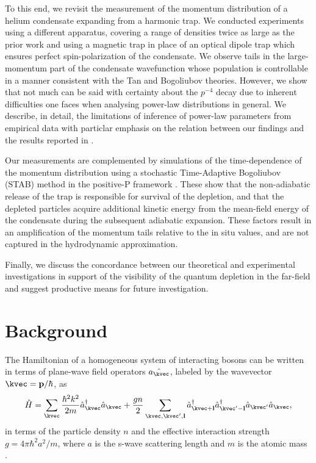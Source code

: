 	To this end, we revisit the measurement of the momentum distribution of a helium condensate expanding from a harmonic trap. 
	We conducted experiments using a different apparatus, covering a range of densities twice as large as the prior work and using a magnetic trap in place of an optical dipole trap which ensures perfect spin-polarization of the condensate. 
	We observe tails in the large-momentum part of the condensate wavefunction whose population is controllable in a manner consistent with the Tan and Bogoliubov theories.
	However, we show that not much can be said with certainty about the $p^{-4}$ decay due to inherent difficulties one faces when analysing power-law distributions in general. 
	We describe, in detail, the limitations of inference of power-law parameters from empirical data with particlar emphasis on the relation between our findings and the results reported in \cite{Chang16}.
	
	Our measurements are complemented by simulations of the time-dependence of the momentum distribution using a stochastic Time-Adaptive Bogoliubov (STAB) method in the positive-P framework \cite{Deuar11,Kheruntsyan12}. 
	These show that the non-adiabatic release of the trap is responsible for survival of the depletion, and that the depleted particles acquire additional kinetic energy from the mean-field energy of the condensate during the subsequent adiabatic expansion. 
	These factors result in an amplification of the momentum tails relative to the in situ values, and are not captured in the hydrodynamic approximation. 
	
	Finally, we discuss the concordance between our theoretical and experimental investigations in support of the visibility of the quantum depletion in the far-field and suggest productive means for future investigation.
	
\section{Background} 
	The Hamiltonian of a homogeneous system of interacting bosons can be written in terms of plane-wave field operators $\hat{a_\kvec}$, labeled by the wavevector $\kvec=\textbf{p}/\hbar$, as
	\begin{equation}
		\hat{H} = \sum_{\kvec} \frac{\hbar^2k^2}{2m}\hat{a}_{\kvec}^\dagger \hat{a}_\kvec + \frac{g n}{2}\sum_{\kvec,\kvec',{\bf l}}\hat{a}_{\kvec+{\bf l}}^\dagger\hat{a}_{\kvec'-{\bf l}}^\dagger \hat{a}_{\kvec'}\hat{a}_{\kvec},
	\end{equation}
	in terms of the particle density $n$ and the effective interaction strength $g=4\pi\hbar^2a^2/m$, where $a$ is the s-wave scattering length and $m$ is the atomic mass \cite{PitaevskiiStringari,PethickSmith}.
   
